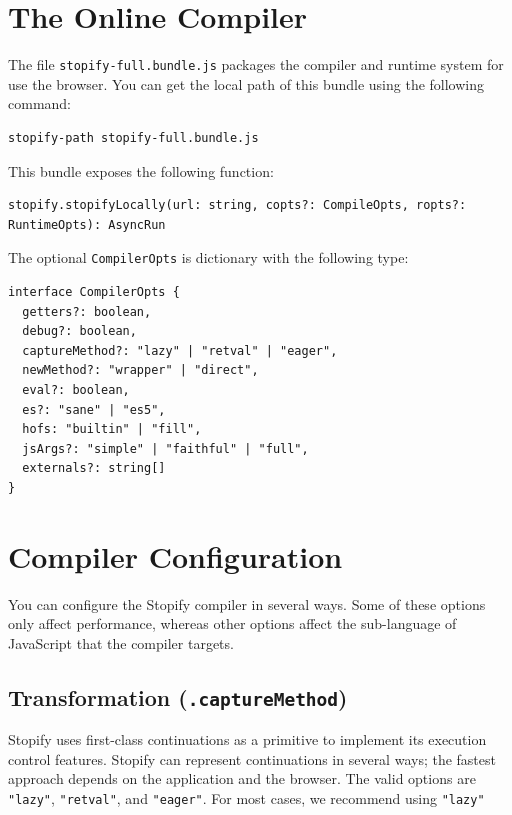 \documentclass[10pt]{book}
\begin{document}
\section{The Online Compiler}
\lstset{language=console}

The file \lstinline|stopify-full.bundle.js| packages the compiler and runtime
system for use the browser. You can get the local path of this bundle using the
following command:
\lstset{language=console}
\begin{lstlisting}
stopify-path stopify-full.bundle.js
\end{lstlisting}

This bundle exposes the following function:

\lstset{language=js}
\begin{lstlisting}
stopify.stopifyLocally(url: string, copts?: CompileOpts, ropts?: RuntimeOpts): AsyncRun
\end{lstlisting}

The optional \lstinline|CompilerOpts| is dictionary with the following type:

\begin{lstlisting}
interface CompilerOpts {
  getters?: boolean,
  debug?: boolean,
  captureMethod?: "lazy" | "retval" | "eager",
  newMethod?: "wrapper" | "direct",
  eval?: boolean,
  es?: "sane" | "es5",
  hofs: "builtin" | "fill",
  jsArgs?: "simple" | "faithful" | "full",
  externals?: string[]
}
\end{lstlisting}



\section{Compiler Configuration}

\lstset{language=js}

You can configure the Stopify compiler in several ways. Some of these
options only affect performance, whereas other options affect the
sub-language of JavaScript that the compiler targets.

\subsection{Transformation (\texttt{.captureMethod})\label{transformation}}

Stopify uses first-class continuations as a primitive to implement its
execution control features. Stopify can represent continuations in several
ways; the fastest approach depends on the application and the browser. The
valid options are \lstinline|"lazy"|, \lstinline|"retval"|, and
\lstinline|"eager"|. For most cases, we recommend using \lstinline|"lazy"|
\end{document}
